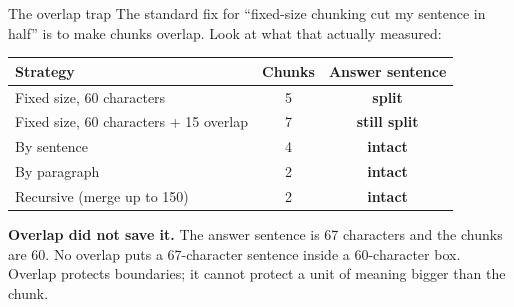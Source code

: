 \documentclass[aspectratio=169]{beamer}
\newcommand{\trapbox}[1]{%
  \begin{tcolorbox}[colback=armred!8, colframe=armred, boxrule=0.6pt, arc=2pt]
  #1
  \end{tcolorbox}}
\begin{document}
\begin{frame}{The overlap trap}
  \vspace{0.4em}
  The standard fix for ``fixed-size chunking cut my sentence in half'' is to make chunks
  overlap. Look at what that actually measured:

  \vspace{0.7em}
  \begin{center}
  \small
  \begin{tabular}{lcc}
    \toprule
    \textbf{Strategy} & \textbf{Chunks} & \textbf{Answer sentence} \\
    \midrule
    Fixed size, 60 characters              & 5 & \color{armred}\textbf{split} \\
    Fixed size, 60 characters + 15 overlap & 7 & \color{armred}\textbf{still split} \\
    By sentence                            & 4 & \color{paramgreen}\textbf{intact} \\
    By paragraph                           & 2 & \color{paramgreen}\textbf{intact} \\
    Recursive (merge up to 150)            & 2 & \color{paramgreen}\textbf{intact} \\
    \bottomrule
  \end{tabular}
  \end{center}

  \vspace{0.8em}
  \trapbox{\textbf{Overlap did not save it.} The answer sentence is 67 characters and the
  chunks are 60. No overlap puts a 67-character sentence inside a 60-character box. Overlap
  protects boundaries; it cannot protect a unit of meaning bigger than the chunk.}
\end{frame}
\end{document}
